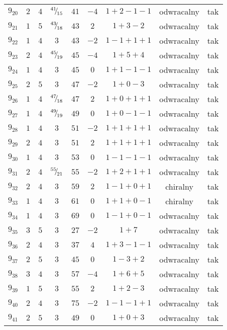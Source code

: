 \begin{longtable}{ccccccccc}
$9_{20}$ & $2$ & $4$ & ${}^{41}{\mskip -5mu/\mskip -3mu}_{15}$ & $41$ & $-4$ & $1+2-1-1$ & odwracalny & tak \\
$9_{21}$ & $1$ & $5$ & ${}^{43}{\mskip -5mu/\mskip -3mu}_{18}$ & $43$ & $2$ & $1+3-2$ & odwracalny & tak \\
$9_{22}$ & $1$ & $4$ & $3$ & $43$ & $-2$ & $1-1+1+1$ & odwracalny & tak \\
$9_{23}$ & $2$ & $4$ & ${}^{45}{\mskip -5mu/\mskip -3mu}_{19}$ & $45$ & $-4$ & $1+5+4$ & odwracalny & tak \\
$9_{24}$ & $1$ & $4$ & $3$ & $45$ & $0$ & $1+1-1-1$ & odwracalny & tak \\
$9_{25}$ & $2$ & $5$ & $3$ & $47$ & $-2$ & $1+0-3$ & odwracalny & tak \\
$9_{26}$ & $1$ & $4$ & ${}^{47}{\mskip -5mu/\mskip -3mu}_{18}$ & $47$ & $2$ & $1+0+1+1$ & odwracalny & tak \\
$9_{27}$ & $1$ & $4$ & ${}^{49}{\mskip -5mu/\mskip -3mu}_{19}$ & $49$ & $0$ & $1+0-1-1$ & odwracalny & tak \\
$9_{28}$ & $1$ & $4$ & $3$ & $51$ & $-2$ & $1+1+1+1$ & odwracalny & tak \\
$9_{29}$ & $2$ & $4$ & $3$ & $51$ & $2$ & $1+1+1+1$ & odwracalny & tak \\
$9_{30}$ & $1$ & $4$ & $3$ & $53$ & $0$ & $1-1-1-1$ & odwracalny & tak \\
$9_{31}$ & $2$ & $4$ & ${}^{55}{\mskip -5mu/\mskip -3mu}_{21}$ & $55$ & $-2$ & $1+2+1+1$ & odwracalny & tak \\
$9_{32}$ & $2$ & $4$ & $3$ & $59$ & $2$ & $1-1+0+1$ & chiralny & tak \\
$9_{33}$ & $1$ & $4$ & $3$ & $61$ & $0$ & $1+1+0-1$ & chiralny & tak \\
$9_{34}$ & $1$ & $4$ & $3$ & $69$ & $0$ & $1-1+0-1$ & odwracalny & tak \\
$9_{35}$ & $3$ & $5$ & $3$ & $27$ & $-2$ & $1+7$ & odwracalny & tak \\
$9_{36}$ & $2$ & $4$ & $3$ & $37$ & $4$ & $1+3-1-1$ & odwracalny & tak \\
$9_{37}$ & $2$ & $5$ & $3$ & $45$ & $0$ & $1-3+2$ & odwracalny & tak \\
$9_{38}$ & $3$ & $4$ & $3$ & $57$ & $-4$ & $1+6+5$ & odwracalny & tak \\
$9_{39}$ & $1$ & $5$ & $3$ & $55$ & $2$ & $1+2-3$ & odwracalny & tak \\
$9_{40}$ & $2$ & $4$ & $3$ & $75$ & $-2$ & $1-1-1+1$ & odwracalny & tak \\
$9_{41}$ & $2$ & $5$ & $3$ & $49$ & $0$ & $1+0+3$ & odwracalny & tak \\

\end{longtable}
